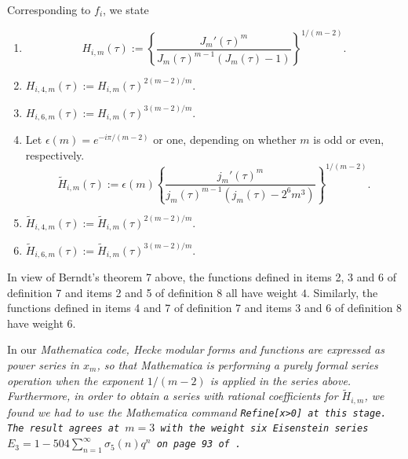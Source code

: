 \documentclass{article}
\begin{document}
 \noindent
  Corresponding to $f_i$, 
 we state
 \begin{definition}
 \begin{enumerate}
 \item
  $$
 H_{i,m}(\tau):=
\left \{
 \frac {J_m'(\tau)^m}
 {J_m(\tau)^{m-1} (J_m(\tau) - 1)}
 \right \}^{1/(m-2)}.$$
  \item  $H_{i,4,m}(\tau):= H_{i,m}(\tau)^{2(m-2)/m}$.
 \item  $H_{i,6,m}(\tau):= H_{i,m}(\tau)^{3(m-2)/m}$.
 \item
 Let $\epsilon(m) = e^{-i \pi/(m-2)}$  or one,
 depending on whether $m$ is odd or even, respectively.
 $$
 \widetilde{H}_{i,m}(\tau):=
\epsilon(m)\left \{
 \frac {j_m'(\tau)^m}
 {j_m(\tau)^{m-1} (j_m(\tau) - 2^6 m^3)}
 \right \}^{1/(m-2)}.$$
 \item 
  $\widetilde{H}_{i,4,m}(\tau):=  
  \widetilde{H}_{i,m}(\tau)^{2(m-2)/m}$.
 \item 
  $\widetilde{H}_{i,6,m}(\tau):=  
  \widetilde{H}_{i,m}(\tau)^{3(m-2)/m}$.
 \end{enumerate}
 \end{definition} 
 \begin{remark}
 In view of Berndt's theorem 7 above, 
 the functions defined in items 2, 3 and 6
 of definition 7 and items 2 and 5 of
 definition 8 all have weight $4$. Similarly,
 the functions defined in
 items 4 and 7 of definition 7 and items
 3 and 6 
 of definition 8 have weight $6$.
 \end{remark} \noindent
In our 
\it Mathematica \rm code, 
Hecke modular forms and functions 
are expressed as 
power series in $x_m$,
so that \it Mathematica \rm is
performing a purely formal 
series operation
when the exponent $1/(m-2)$
is applied in the series above.
Furthermore, in order to obtain 
a series with rational coefficients
for  $\widetilde{H}_{i,m}$, 
we found we had to use the 
\it Mathematica \rm command 
\tt Refine[x>0] \rm at this stage.
The result agrees at $m  = 3$
with the
weight six Eisenstein series 
$E_3 = 1 - 504\sum_{n=1}^{\infty} \sigma_5(n) q^n$
on page 93 of \cite{serre1970course}.  
\end{document}
